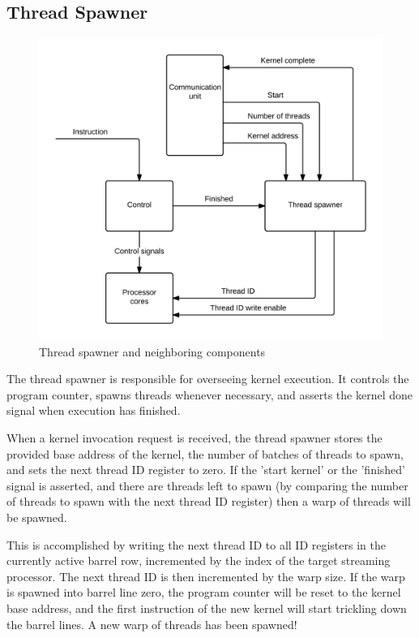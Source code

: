 \subsection{Thread Spawner}

\begin{figure}[H]
	\centering
	\includegraphics[width=\textwidth]{../gpu/diagrams/thread_spawner.png}
	\caption{Thread spawner and neighboring components}
	\label{fig:thread_spawner}
\end{figure}

The thread spawner is responsible for overseeing kernel execution.
It controls the program counter, spawns threads whenever necessary, and asserts the kernel done signal when execution has finished.

When a kernel invocation request is received, the thread spawner stores the provided base address of the kernel, the number of batches of threads to spawn, and sets the next thread ID register to zero.
If the 'start kernel' or the 'finished' signal is asserted, and there are threads left to spawn (by comparing the number of threads to spawn with the next thread ID register) then a warp of threads will be spawned.

This is accomplished by writing the next thread ID to all ID registers in the currently active barrel row, incremented by the index of the target streaming processor.
The next thread ID is then incremented by the warp size.
If the warp is spawned into barrel line zero, the program counter will be reset to the kernel base address, and the first instruction of the new kernel will start trickling down the barrel lines.
A new warp of threads has been spawned!
